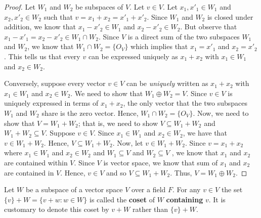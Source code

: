 \begin{proof}

Let \( W_{1}  \) and \( W_{2}  \) be subspaces of \( V  \). Let \( v \in V  \).  Let \( x_{1}, x'_{1} \in W_{1}  \) and \( x_{2}, x'_{2} \in W_{2}  \) such that \( v = x_{1} + x_{2} = x'_{1} + x'_{2}  \). Since \( W_{1}  \) and \( W_{2}  \) is closed under addition, we know that \( x_{1} - x'_{2} \in W_{1}  \) and \( x_{2} - x'_{2} \in W_{2}  \). But observe that \( x_{1} - x'_{1} = x_{2} - x'_{2} \in W_{1} \cap W_{2}  \). Since \( V  \) is a direct sum of the two subspaces \( W_{1}  \) and \( W_{2}  \), we know that \( W_{1} \cap W_{2} = \{ O_{V} \}  \) which implies that \( x_{1} = x'_{1} \) and \( x_{2} = x'_{2} \). This tells us that every \( v  \) can be expressed uniquely as \( x_{1} + x_{2}   \) with \( x_{1} \in W_{1}  \) and \( x_{2} \in W_{2} \).

Conversely, suppose every vector \( v \in V  \) can be \textit{uniquely} written as \( x_{1} + x_{2}  \) with \( x_{1} \in W_{1}  \) and \( x_{2} \in W_{2} \). We need to show that \( W_{1} \oplus W_{2} = V \). Since \( v \in V  \) is uniquely expressed in terms of \( x_{1} + x_{2}  \), the only vector that the two subspaces \( W_{1}  \) and \( W_{2}  \) share is the zero vector. Hence, \( W_{1} \cap W_{2} = \{ O_{V} \}  \). Now, we need to show that \( V = W_{1} + W_{2} \); that is, we need to show \( V \subseteq W_{1} + W_{2}  \) and \( W_{1} + W_{2} \subseteq V  \). Suppose \( v \in V  \). Since \( x_{1} \in W_{1}  \) and \( x_{2} \in W_{2} \), we have that \( v \in W_{1} + W_{2} \). Hence, \( V \subseteq W_{1} + W_{2} \).  Now, let \( v \in W_{1} + W_{2}  \). Since \( v = x_{1} + x_{2}  \) where \( x_{1} \in W_{1}  \) and \( x_{2} \in W_{2}  \) and \( W_{1} \subseteq V  \) and \( W_{2} \subseteq V  \) , we know that \( x_{1} \) and \(x_{2} \) are contained within \( V  \). Since \( V  \) is vector space, we know that sum of  \( x_{1} \) and \( x_{2}  \) are contained in \( V  \). Hence, \( v \in V  \) and so \( V \subseteq W_{1} + W_{2} \). Thus, \( V = W_{1} \oplus W_{2} \).
\end{proof}

\begin{definition}[Cosets]Let \( W  \) be a subspace of a vector space \( V  \) over a field \( F  \). For any \( v \in V  \) the set \( \{ v  \}  + W = \{ v + w : w \in W \}   \) is called the \textbf{coset} of \( W  \) \textbf{containing} \( v  \). It is customary to denote this coset by \( v + W  \) rather than \( \{ v  \}  + W  \). 
\end{definition}

